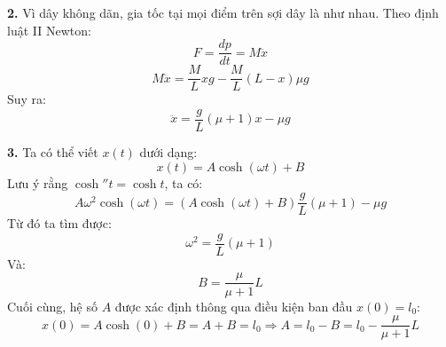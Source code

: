 \noindent\textbf{2.} Vì dây không dãn, gia tốc tại mọi điểm trên sợi dây là như nhau. Theo định luật II Newton:
\begin{equation*}
  F = \frac{dp}{dt} = M \ddot{x}
\end{equation*}
\begin{equation*}
  M \ddot{x} = \frac{M}{L} x g - \frac{M}{L} (L - x) \mu g
\end{equation*}
Suy ra:
\begin{equation*}
  \ddot{x} = \frac{g}{L} (\mu + 1) x - \mu g
\end{equation*}

\noindent\textbf{3.} Ta có thể viết $x(t)$ dưới dạng:
\begin{equation*}
  x(t) = A \cosh(\omega t) + B
\end{equation*}
Lưu ý rằng $\cosh'' t = \cosh t$, ta có:
\begin{equation*}
  A \omega^2 \cosh(\omega t) = (A \cosh(\omega t) + B) \frac{g}{L} (\mu + 1) - \mu g
\end{equation*}
Từ đó ta tìm được:
\begin{equation*}
  \omega^2 = \frac{g}{L} (\mu + 1)
\end{equation*}
Và:
\begin{equation*}
  B = \frac{\mu}{\mu + 1} L
\end{equation*}
Cuối cùng, hệ số $A$ được xác định thông qua điều kiện ban đầu $x(0) = l_0$:
\begin{equation*}
  x(0) = A \cosh(0) + B = A + B = l_0 \Rightarrow A = l_0 - B = l_0 - \frac{\mu}{\mu + 1} L
\end{equation*}

